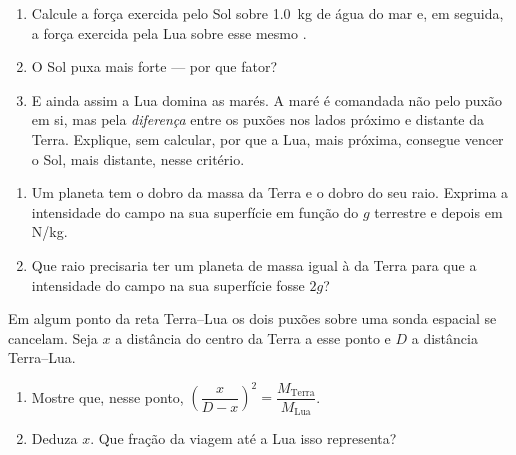 \begin{exercise}[$\star\star$]\label{exo:g10:universal-gravitation:10}
\begin{enumerate}
  \item Calcule a força exercida pelo Sol sobre \qty{1.0}{kg} de água do
        mar e, em seguida, a força exercida pela Lua sobre esse mesmo
        .
  \item O Sol puxa mais forte --- por que fator?
  \item E ainda assim a Lua domina as marés. A maré é comandada não pelo
        puxão em si, mas pela \emph{diferença} entre os puxões nos lados
        próximo e distante da Terra. Explique, sem calcular, por que a
        Lua, mais próxima, consegue vencer o Sol, mais distante, nesse
        critério.
\end{enumerate}
\end{exercise}

\begin{exercise}[$\star\star$]\label{exo:g10:universal-gravitation:11}
\begin{enumerate}
  \item Um planeta tem o dobro da massa da Terra e o dobro do seu raio.
        Exprima a intensidade do campo na sua superfície em função do $g$
        terrestre e depois em \unit{N/kg}.
  \item Que raio precisaria ter um planeta de massa igual à da Terra para
        que a intensidade do campo na sua superfície fosse $2g$?
\end{enumerate}
\end{exercise}

\begin{exercise}[$\star\star\star$]\label{exo:g10:universal-gravitation:12}
Em algum ponto da reta Terra--Lua os dois puxões sobre uma sonda espacial
se cancelam. Seja $x$ a distância do centro da Terra a esse ponto e $D$ a
distância Terra--Lua.
\begin{enumerate}
  \item Mostre que, nesse ponto,
        $\left(\dfrac{x}{D - x}\right)^{2}
        = \dfrac{M_{\text{Terra}}}{M_{\text{Lua}}}$.
  \item Deduza $x$. Que fração da viagem até a Lua isso representa?
\end{enumerate}
\end{exercise}

